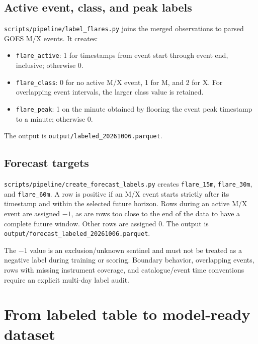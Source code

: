 \documentclass[11pt,a4paper]{article}
\begin{document}
\subsection{Active event, class, and peak labels}
\texttt{scripts/pipeline/label\_flares.py} joins the merged observations to parsed GOES M/X events. It creates:
\begin{itemize}
  \item \texttt{flare\_active}: 1 for timestamps from event start through event end, inclusive; otherwise 0.
  \item \texttt{flare\_class}: 0 for no active M/X event, 1 for M, and 2 for X. For overlapping event intervals, the larger class value is retained.
  \item \texttt{flare\_peak}: 1 on the minute obtained by flooring the event peak timestamp to a minute; otherwise 0.
\end{itemize}
The output is \texttt{output/labeled\_20261006.parquet}.

\subsection{Forecast targets}
\texttt{scripts/pipeline/create\_forecast\_labels.py} creates \texttt{flare\_15m}, \texttt{flare\_30m}, and \texttt{flare\_60m}. A row is positive if an M/X event starts strictly after its timestamp and within the selected future horizon. Rows during an active M/X event are assigned $-1$, as are rows too close to the end of the data to have a complete future window. Other rows are assigned 0. The output is \texttt{output/forecast\_labeled\_20261006.parquet}.

The $-1$ value is an exclusion/unknown sentinel and must not be treated as a negative label during training or scoring. Boundary behavior, overlapping events, rows with missing instrument coverage, and catalogue/event time conventions require an explicit multi-day label audit.

\section{From labeled table to model-ready dataset}
\end{document}
